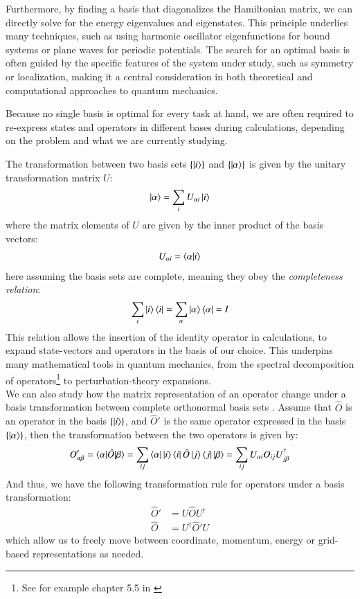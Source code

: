 \documentclass{subfiles}
\begin{document}
Furthermore, by finding a basis that diagonalizes the Hamiltonian matrix, we can directly solve for the energy eigenvalues and eigenstates. This principle underlies many techniques, such as using harmonic oscillator eigenfunctions for bound systems or plane waves for periodic potentials\cite{griffiths2018introduction, kittel2018introduction}. The search for an optimal basis is often guided by the specific features of the system under study, such as symmetry or localization, making it a central consideration in both theoretical and computational approaches to quantum mechanics. 

Because no single basis is optimal for every task at hand, we are often required to re-express states and operators in different bases during calculations, depending on the problem and what we are currently studying. 

The transformation between two basis sets $\{\ket{i}\}$ and $\{\ket{\alpha}\}$ is given by the unitary transformation matrix $U$:
\begin{align*}
    \ket{\alpha} = \sum_i U_{\alpha i}\ket{i}
\end{align*}
where the matrix elements of $U$ are given by the inner product of the basis vectors:
\begin{align*}
    U_{\alpha i} = \braket{\alpha|i}
\end{align*}
here assuming the basis sets are complete, meaning they obey the \emph{completeness relation}:
\begin{align*}
    \sum_i \ket{i}\bra{i} = \sum_\alpha \ket{\alpha}\bra{\alpha} = I
\end{align*}
This relation allows the insertion of the identity operator in calculations, to expand state-vectors and operators in the basis of our choice. This underpins many mathematical tools in quantum mechanics, from the spectral decomposition of operators\footnote{See for example chapter 5.5 in \cite{strang2000linear}} to perturbation-theory expansions\cite{griffiths2018introduction, berera2021quantum, sakurai1986modern}. \\


We can also study how the matrix representation of an operator change under a basis transformation between complete orthonormal basis sets \cite{szabo1996modern}.
Assume that $\hat O$ is an operator in the basis $\{\ket{i}\}$, and $\hat O'$ is the same operator expressed in the basis $\{\ket{\alpha}\}$, then the transformation between the two operators is given by:
\begin{align*}
    O'_{\alpha\beta} = \braket{\alpha|\hat O|\beta} = \sum_{ij}\bra{\alpha}\ket{i}\bra{i}\hat O\ket{j}\bra{j}\ket{\beta} = \sum_{ij}U_{\alpha i}O_{ij}U^\dagger_{j\beta}
\end{align*}
And thus, we have the following transformation rule for operators under a basis transformation:
\begin{align*}
    \hat O' &= U\hat OU^\dagger \\
    \hat O &= U^\dagger\hat O'U
\end{align*}
which allow us to freely move between coordinate, momentum, energy or grid-based representations as needed.
\end{document}
